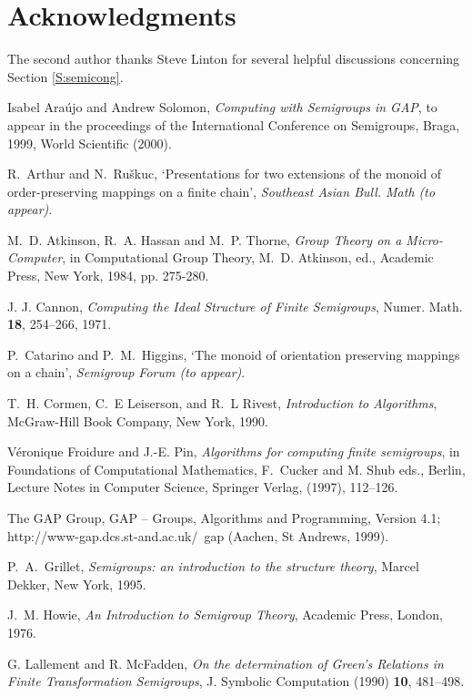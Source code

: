 \documentclass{acmconf}
\def\gap{\sf GAP}
\begin{document}
\section*{Acknowledgments}
The second author thanks Steve Linton for several helpful discussions
concerning Section \ref{S:semicong}.

\begin{thebibliography}{9}

 Isabel Ara\'ujo and Andrew Solomon,
{\em Computing with Semigroups in GAP}, to appear in the
proceedings of the International Conference on Semigroups,
Braga, 1999, World Scientific (2000).

 R.~Arthur and N.~Ru\v{s}kuc,
`Presentations for two extensions of the monoid of order-preserving
mappings on a finite chain', {\em Southeast Asian Bull. Math (to appear)}.

   M.~D. Atkinson, R.~A. Hassan and M.~P. Thorne, \emph{Group Theory on a 
   Micro-Computer}, in Computational Group Theory, M.~D. Atkinson, ed., 
   Academic Press, New York, 1984, pp. 275-280. 
 
 J. J. Cannon, {\em Computing the  Ideal Structure
of Finite Semigroups}, Numer. Math. {\bf 18},  254--266, 1971.

P.~Catarino and P.~M.~Higgins,
`The monoid of orientation preserving mappings on a chain',
{\em Semigroup Forum (to appear)}.

   T.~H. Cormen, C.~E Leiserson, and R.~L Rivest, \emph{Introduction
   to Algorithms}, McGraw-Hill Book Company, New York, 1990.

 V\'eronique Froidure and J.-E. Pin,
{\em Algorithms for computing finite semigroups},
in Foundations of Computational Mathematics, F.~Cucker 
and M. Shub eds., Berlin, Lecture Notes in Computer Science,
Springer Verlag, (1997), 112--126. 



 The GAP Group, {\gap} -- Groups, Algorithms and Programming,
Version 4.1; http://www-gap.dcs.st-and.ac.uk/~gap (Aachen, St Andrews, 1999).

	P.~A.~Grillet, \emph{Semigroups: an introduction to the structure
theory}, Marcel Dekker, New York, 1995.

   J.~M. Howie, \emph{An Introduction to Semigroup Theory}, Academic Press,
   London, 1976.

 G. Lallement and R. McFadden,
{\em On the determination of Green's Relations in Finite Transformation
Semigroups}, J. Symbolic Computation (1990) {\bf 10}, 481--498.


\end{thebibliography}
\end{document}
